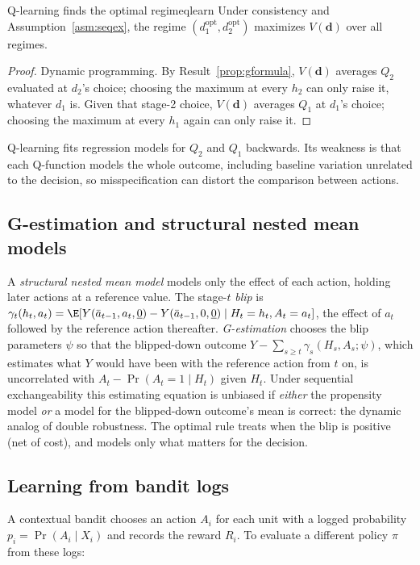 \documentclass[11pt]{article}
\begin{document}
\begin{prop}{Q-learning finds the optimal regime}{qlearn}
Under consistency and Assumption~\ref{asm:seqex}, the regime $(d_1^{\text{opt}}, d_2^{\text{opt}})$ maximizes $V(\mathbf d)$ over all
regimes.
\end{prop}
\begin{proof}
Dynamic programming. By Result~\ref{prop:gformula}, $V(\mathbf d)$ averages $Q_2$ evaluated at $d_2$'s choice; choosing the maximum at
every $h_2$ can only raise it, whatever $d_1$ is. Given that stage-2 choice, $V(\mathbf d)$ averages $Q_1$ at $d_1$'s choice;
choosing the maximum at every $h_1$ again can only raise it.
\end{proof}

Q-learning fits regression models for $Q_2$ and $Q_1$ backwards. Its weakness is that each Q-function models the whole
outcome, including baseline variation unrelated to the decision, so misspecification can distort the comparison between
actions.

\subsection{G-estimation and structural nested mean models}

A \emph{structural nested mean model} models only the effect of each action, holding later actions at a reference value. The
stage-$t$ \emph{blip} is $\gamma_t(h_t, a_t) = \E[Y(\bar a_{t-1}, a_t, \underline 0) - Y(\bar a_{t-1}, 0, \underline 0) \mid H_t = h_t, A_t = a_t]$, the
effect of $a_t$ followed by the reference action thereafter. \emph{G-estimation} chooses the blip parameters $\psi$ so that the
blipped-down outcome $Y - \sum_{s \ge t}\gamma_s(H_s, A_s; \psi)$, which estimates what $Y$ would have been with the reference
action from $t$ on, is uncorrelated with $A_t - \Pr(A_t = 1 \mid H_t)$ given $H_t$. Under sequential exchangeability this
estimating equation is unbiased if \emph{either} the propensity model \emph{or} a model for the blipped-down outcome's mean is
correct: the dynamic analog of double robustness. The optimal rule treats when the blip is positive (net of cost), and
models only what matters for the decision.

\subsection{Learning from bandit logs}

A contextual bandit chooses an action $A_i$ for each unit with a logged probability $p_i = \Pr(A_i \mid X_i)$ and records the
reward $R_i$. To evaluate a different policy $\pi$ from these logs:
\end{document}
